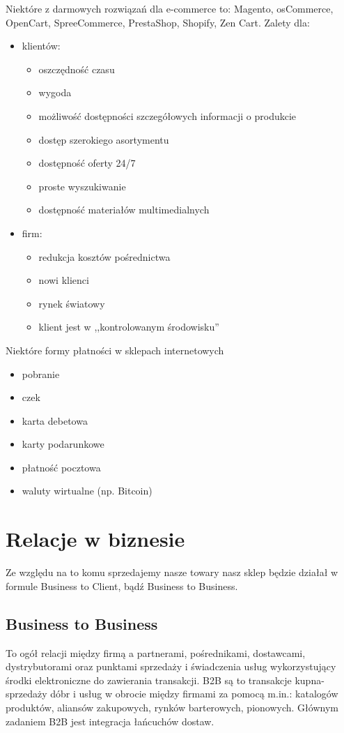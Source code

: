 \documentclass{report}
\begin{document}
Niektóre z darmowych rozwiązań dla e-commerce to: Magento, osCommerce, OpenCart, SpreeCommerce, PrestaShop, Shopify, Zen Cart.
Zalety dla:
\begin{itemize}
\item klientów:
\begin{itemize}
\item oszczędność czasu
\item wygoda
\item możliwość dostępności szczegółowych informacji o produkcie
\item dostęp szerokiego asortymentu
\item dostępność oferty 24/7
\item proste wyszukiwanie
\item dostępność materiałów multimedialnych
\end{itemize}
\item firm:
\begin{itemize}
\item redukcja kosztów pośrednictwa
\item nowi klienci
\item rynek światowy
\item klient jest w ,,kontrolowanym środowisku''
\end{itemize}
\end{itemize}
Niektóre formy płatności w sklepach internetowych
\begin{itemize}
\item pobranie
\item czek
\item karta debetowa
\item karty podarunkowe
\item płatność pocztowa
\item waluty wirtualne (np. Bitcoin)
\end{itemize}

\section{Relacje w biznesie}
Ze względu na to komu sprzedajemy nasze towary nasz sklep będzie działał w formule Business to Client, bądź Business to Business.
\subsection{Business to Business}
To ogół relacji między firmą a partnerami, pośrednikami, dostawcami, dystrybutorami oraz punktami
sprzedaży i świadczenia usług wykorzystujący środki elektroniczne do zawierania transakcji. B2B są to
transakcje kupna-sprzedaży dóbr i usług w obrocie między firmami za pomocą m.in.: katalogów produktów, aliansów zakupowych, rynków barterowych, pionowych. Głównym zadaniem B2B jest integracja łańcuchów dostaw.
\end{document}
